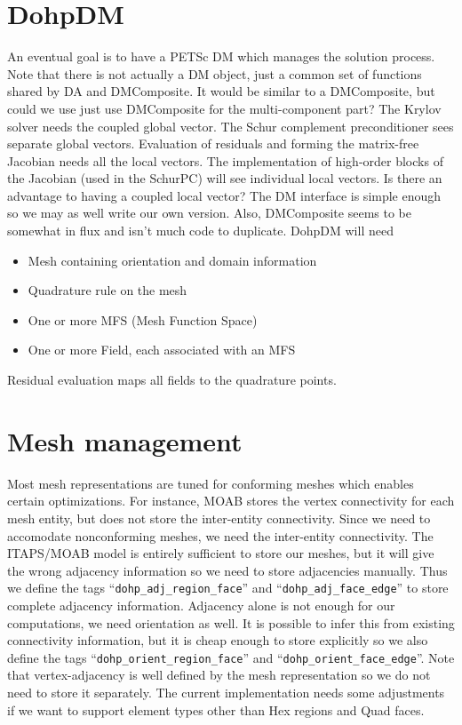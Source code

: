 \documentclass[a4paper]{article}
\newcommand{\trl}[1]{\texttt{#1}}
\begin{document}
\section{DohpDM}
An eventual goal is to have a PETSc DM which manages the solution process.  Note
that there is not actually a DM object, just a common set of functions shared by
DA and DMComposite.  It would be similar to a DMComposite, but could we use just
use DMComposite for the multi-component part?  The Krylov solver needs the
coupled global vector.  The Schur complement preconditioner sees separate global
vectors.  Evaluation of residuals and forming the matrix-free Jacobian needs all
the local vectors.  The implementation of high-order blocks of the Jacobian
(used in the SchurPC) will see individual local vectors.  Is there an advantage
to having a coupled local vector?  The DM interface is simple enough so we may
as well write our own version.  Also, DMComposite seems to be somewhat in flux
and isn't much code to duplicate.  DohpDM will need
\begin{itemize}
\item Mesh containing orientation and domain information
\item Quadrature rule on the mesh
\item One or more MFS (Mesh Function Space)
\item One or more Field, each associated with an MFS
\end{itemize}
Residual evaluation maps all fields to the quadrature points.

\section{Mesh management}
Most mesh representations are tuned for conforming meshes which enables certain
optimizations.  For instance, MOAB stores the vertex connectivity for each mesh
entity, but does not store the inter-entity connectivity.  Since we need to
accomodate nonconforming meshes, we need the inter-entity connectivity.  The
ITAPS/MOAB model is entirely sufficient to store our meshes, but it will give
the wrong adjacency information so we need to store adjacencies manually.  Thus
we define the tags ``\trl{dohp_adj_region_face}'' and
``\trl{dohp_adj_face_edge}'' to store complete adjacency information.  Adjacency
alone is not enough for our computations, we need orientation as well.  It is
possible to infer this from existing connectivity information, but it is cheap
enough to store explicitly so we also define the tags
``\trl{dohp_orient_region_face}'' and ``\trl{dohp_orient_face_edge}''.  Note
that vertex-adjacency is well defined by the mesh representation so we do not
need to store it separately.  The current implementation needs some adjustments
if we want to support element types other than Hex regions and Quad faces.
\end{document}
